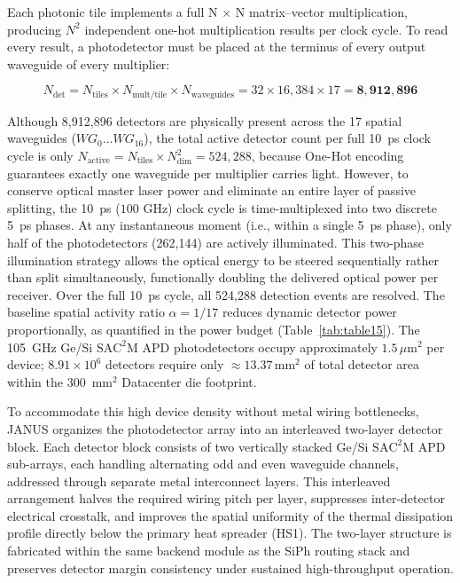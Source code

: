 \documentclass[journal]{IEEEtran}
\begin{document}
Each photonic tile implements a full N $\times$ N matrix--vector multiplication, producing $N^{2}$ independent one-hot multiplication
results per clock cycle. To read every result, a photodetector must be placed at the terminus of every output waveguide of every multiplier:

\begin{equation}
N_{\mathrm{det}} = N_{\mathrm{tiles}} \times N_{\mathrm{mult/tile}} \times N_{\mathrm{waveguides}} = 32 \times 16{,}384 \times 17 = \mathbf{8{,}912{,}896}
\end{equation}

Although 8,912,896 detectors are physically present across the 17 spatial waveguides ($WG_0 \dots WG_{16}$), the total active detector count per full 10~ps clock cycle is only $N_{\text{active}} = N_{\text{tiles}} \times N_{\text{dim}}^2 = 524{,}288$, because One-Hot encoding guarantees exactly one waveguide per multiplier carries light. However, to conserve optical master laser power and eliminate an entire layer of passive splitting, the 10~ps ($100\text{ GHz}$) clock cycle is time-multiplexed into two discrete 5~ps phases. At any instantaneous moment (i.e., within a single 5~ps phase), only half of the photodetectors (262,144) are actively illuminated. This two-phase illumination strategy allows the optical energy to be steered sequentially rather than split simultaneously, functionally doubling the delivered optical power per receiver. Over the full 10~ps cycle, all 524,288 detection events are resolved. The baseline spatial activity ratio $\alpha = 1/17$ reduces dynamic detector power proportionally, as quantified in the power budget (Table~\ref{tab:table15}). The 105~GHz Ge/Si $\mathrm{SAC^2M}$ APD photodetectors occupy approximately $1.5\,\mu\text{m}^2$ per device; $8.91 \times 10^{6}$ detectors require only $\approx 13.37\,\text{mm}^2$ of total detector area within the 300~$\text{mm}^{2}$ Datacenter die footprint.

To accommodate this high device density without metal wiring bottlenecks, JANUS organizes the photodetector array into an interleaved two-layer detector block. Each detector block consists of two vertically stacked Ge/Si $\mathrm{SAC^2M}$ APD sub-arrays, each handling alternating odd and even waveguide channels, addressed through separate metal interconnect layers. This interleaved arrangement halves the required wiring pitch per layer, suppresses inter-detector electrical crosstalk, and improves the spatial uniformity of the thermal dissipation profile directly below the primary heat spreader (HS1). The two-layer structure is fabricated within the same backend module as the SiPh routing stack and preserves detector margin consistency under sustained high-throughput operation.
\end{document}
